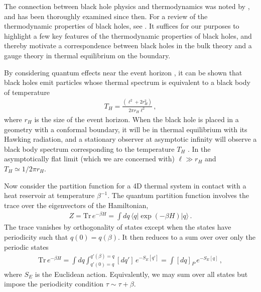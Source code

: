 \documentclass[../PhD.tex]{subfiles}
\begin{document}
The connection between black hole physics and thermodynamics was noted by \cite{Bekenstein:1973ur}, and has been thoroughly examined since then. For a review of the thermodynamic properties of black holes, see \cite{Jacobson1996, Bardeen:1973gs, Hawking:1982dh, 1803.03633}. It suffices for our purposes to highlight a few key features of the thermodynamic properties of black holes, and thereby motivate a correspondence between black holes in the bulk theory and a gauge theory in thermal equilibrium on the boundary.

By considering quantum effects near the event horizon \cite{Hawking:1974rv}, it can be shown that black holes emit particles whose thermal spectrum is equivalent to a black body of temperature \cite{Hawking:1974sw}
\begin{align}
\label{hawking temp}
T_H = \frac{(\ell^2 + 2r_H^2)}{2 \pi r_H \ell^2} \, ,
\end{align}
where $r_H$ is the size of the event horizon. When the black hole is placed in a geometry with a conformal boundary, it will be in thermal equilibrium with its Hawking radiation, and a stationary observer at asymptotic infinity will observe a black body spectrum corresponding to the temperature $T_H$ \cite{Carroll:2004st}. In the asymptotically flat limit (which we are concerned with) $\ell \gg r_H$ and $T_H \simeq 1/2\pi r_H$. 

Now consider the partition function for a 4D thermal system in contact with a heat reservoir at temperature $\beta^{-1}$. The quantum partition function involves the trace over the eigenvectors of the Hamiltonian,
\begin{align}
\label{quantum par}
Z = \text{Tr} \, e^{- \beta H} = \int dq \, \langle q | \exp ( - \beta H ) | q \rangle \, .
\end{align}
The trace vanishes by orthogonality of states except when the states have periodicity such that $q(0) = q(\beta)$. It then reduces to a sum over over only the periodic states \cite{Schellekens}
\begin{align}
\label{cft trace}
\text{Tr} \, e^{ - \beta H} = \int dq \int^{q'(\beta)=q}_{q'(0)=q} [dq'] \, e^{-S_E[q']} = \int [dq]_P \, e^{-S_E[q]} \, ,
\end{align}
where $S_E$ is the Euclidean action. Equivalently, we may sum over all states but impose the periodicity condition $\tau \sim \tau + \beta$. 
\end{document}
